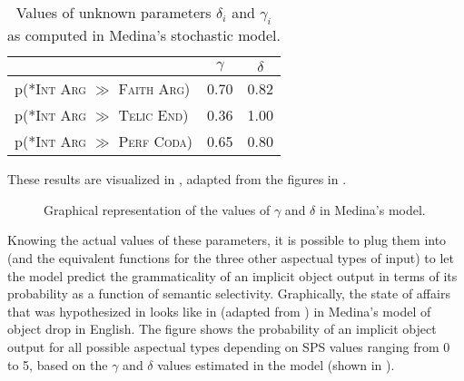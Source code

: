 \begin{table}[htb] %
\caption{Values of unknown parameters $\delta_i$ and $\gamma_i$ as computed in Medina's stochastic model.}
\begin{tabular}{l|cc}
                                                                                & $\gamma$ & $\delta$ \\
                                                                                \hline
p(\textsc{*Int Arg} $\gg$ \textsc{Faith Arg}) & 0.70        & 0.82        \\
p(\textsc{*Int Arg} $\gg$ \textsc{Telic End}) & 0.36        & 1.00        \\
p(\textsc{*Int Arg} $\gg$ \textsc{Perf Coda}) & 0.65        & 0.80       
\end{tabular}
\end{table}

These results are visualized in , adapted from the figures in \textcite[143-144]{Medina2007}.

\begin{figure}[htb]
\caption{Graphical representation of the values of $\gamma$ and $\delta$ in Medina's model.}
\end{figure}

Knowing the actual values of these parameters, it is possible to plug them into  (and the equivalent functions for the three other aspectual types of input) to let the model predict the grammaticality of an implicit object output in terms of its probability as a function of semantic selectivity. Graphically, the state of affairs that was hypothesized in  looks like in  (adapted from \textcite[145]{Medina2007}) in Medina's model of object drop in English. The figure shows the probability of an implicit object output for all possible aspectual types depending on SPS values ranging from 0 to 5, based on the $\gamma$ and $\delta$ values estimated in the model (shown in ).

